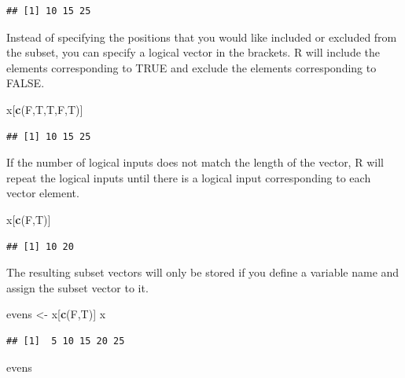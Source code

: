 \documentclass[
]{book}
\newenvironment{Shaded}{\begin{snugshade}}{\end{snugshade}}
\newcommand{\FunctionTok}[1]{\textcolor[rgb]{0.13,0.29,0.53}{\textbf{#1}}}
\newcommand{\NormalTok}[1]{#1}
\newcommand{\OtherTok}[1]{\textcolor[rgb]{0.56,0.35,0.01}{#1}}
\theoremstyle{definition}
\theoremstyle{definition}
\theoremstyle{definition}
\theoremstyle{definition}
\theoremstyle{remark}
\begin{document}
\begin{verbatim}
## [1] 10 15 25
\end{verbatim}

Instead of specifying the positions that you would like included or excluded from the subset, you can specify a logical vector in the brackets. R will include the elements corresponding to TRUE and exclude the elements corresponding to FALSE.

\begin{Shaded}
\begin{Highlighting}[]
\NormalTok{x[}\FunctionTok{c}\NormalTok{(F,T,T,F,T)]}
\end{Highlighting}
\end{Shaded}

\begin{verbatim}
## [1] 10 15 25
\end{verbatim}

If the number of logical inputs does not match the length of the vector, R will repeat the logical inputs until there is a logical input corresponding to each vector element.

\begin{Shaded}
\begin{Highlighting}[]
\NormalTok{x[}\FunctionTok{c}\NormalTok{(F,T)]}
\end{Highlighting}
\end{Shaded}

\begin{verbatim}
## [1] 10 20
\end{verbatim}

The resulting subset vectors will only be stored if you define a variable name and assign the subset vector to it.

\begin{Shaded}
\begin{Highlighting}[]
\NormalTok{evens }\OtherTok{\textless{}{-}}\NormalTok{ x[}\FunctionTok{c}\NormalTok{(F,T)]}
\NormalTok{x}
\end{Highlighting}
\end{Shaded}

\begin{verbatim}
## [1]  5 10 15 20 25
\end{verbatim}

\begin{Shaded}
\begin{Highlighting}[]
\NormalTok{evens}
\end{Highlighting}
\end{Shaded}
\end{document}
